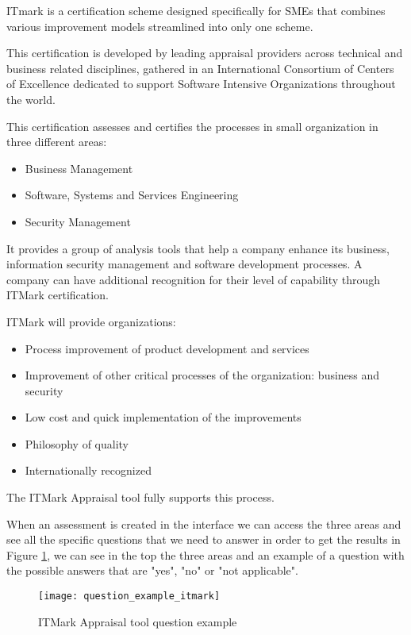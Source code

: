 ITmark \citep{ITMARK} is a certification scheme designed specifically for SMEs that combines various improvement models streamlined into only one scheme.

This certification is developed by leading appraisal providers across technical and business related disciplines, gathered in an International Consortium of Centers of Excellence dedicated to support Software Intensive Organizations throughout the world.

This certification assesses and certifies the processes in small organization in three different areas:
\begin{itemize}
	\item Business Management
	\item Software, Systems and Services Engineering
	\item Security Management
\end{itemize}

It provides a group of analysis tools that help a company enhance its business, information security management and software development processes. A company can have additional recognition for their level of capability through ITMark certification.

ITMark will provide organizations:
\begin{itemize}
	\item Process improvement of product development and services
	\item Improvement of other critical processes of the organization: business and security
	\item Low cost and quick implementation of the improvements
	\item Philosophy of quality
	\item Internationally recognized
\end{itemize}

The ITMark Appraisal tool \citep{ITMARKASSESSMENT} fully supports this process.


When an assessment is created in the interface we can access the three areas and see all the specific questions that we need to answer in order to get the results in Figure \ref{fig:itmark_question}, we can see in the top the three areas and an example of a question with the possible answers that are "yes", "no" or "not applicable".

\begin{figure}[H]
	\begin{center}
		\leavevmode
		\texttt{[image: question\_example\_itmark]}
		\caption{ITMark Appraisal tool question example}
		\label{fig:itmark_question}
	\end{center}
\end{figure}

